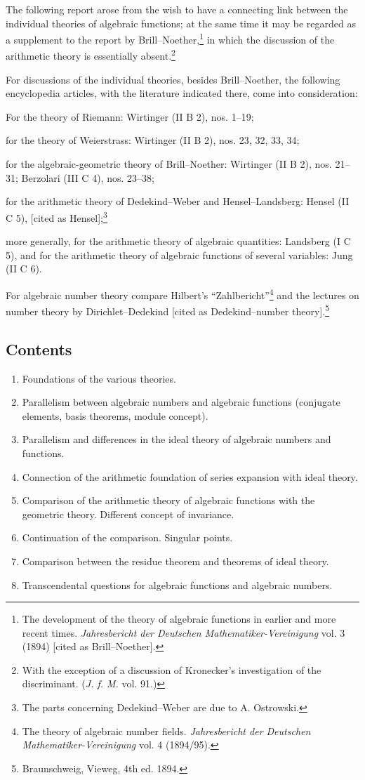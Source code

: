 \documentclass[11pt]{article}
\begin{document}
The following report arose from the wish to have a connecting link between the individual theories of algebraic functions; at the same time it may be regarded as a supplement to the report by Brill--Noether,\footnote{The development of the theory of algebraic functions in earlier and more recent times. \emph{Jahresbericht der Deutschen Mathematiker-Vereinigung} vol. 3 (1894) [cited as Brill--Noether].} in which the discussion of the arithmetic theory is essentially absent.\footnote{With the exception of a discussion of Kronecker's investigation of the discriminant. (\emph{J. f. M.} vol. 91.)}

For discussions of the individual theories, besides Brill--Noether, the following encyclopedia articles, with the literature indicated there, come into consideration:

For the theory of Riemann: Wirtinger (II B 2), nos. 1--19;

for the theory of Weierstrass: Wirtinger (II B 2), nos. 23, 32, 33, 34;

for the algebraic-geometric theory of Brill--Noether: Wirtinger (II B 2), nos. 21--31; Berzolari (III C 4), nos. 23--38;

for the arithmetic theory of Dedekind--Weber and Hensel--Landsberg: Hensel (II C 5), [cited as Hensel];\footnote{The parts concerning Dedekind--Weber are due to A. Ostrowski.}

more generally, for the arithmetic theory of algebraic quantities: Landsberg (I C 5), and for the arithmetic theory of algebraic functions of several variables: Jung (II C 6).

For algebraic number theory compare Hilbert's ``Zahlbericht''\footnote{The theory of algebraic number fields. \emph{Jahresbericht der Deutschen Mathematiker-Vereinigung} vol. 4 (1894/95).} and the lectures on number theory by Dirichlet--Dedekind [cited as Dedekind--number theory].\footnote{Braunschweig, Vieweg, 4th ed. 1894.}

\subsection*{Contents}
\begin{enumerate}
\item Foundations of the various theories.
\item Parallelism between algebraic numbers and algebraic functions (conjugate elements, basis theorems, module concept).
\item Parallelism and differences in the ideal theory of algebraic numbers and functions.
\item Connection of the arithmetic foundation of series expansion with ideal theory.
\item Comparison of the arithmetic theory of algebraic functions with the geometric theory. Different concept of invariance.
\item Continuation of the comparison. Singular points.
\item Comparison between the residue theorem and theorems of ideal theory.
\item Transcendental questions for algebraic functions and algebraic numbers.
\end{enumerate}
\end{document}
